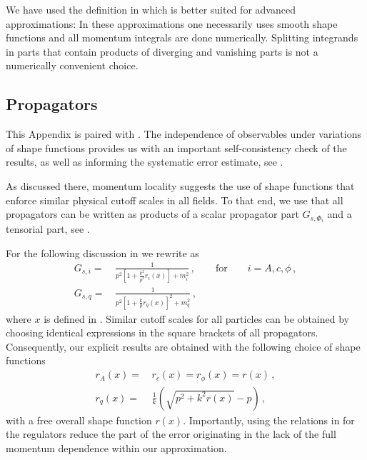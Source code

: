 \documentclass[aps,twocolumn,prd,superscriptaddress]{revtex4-2}
\begin{document}
We have used the definition in  which is better suited for advanced approximations: In these approximations one necessarily uses smooth shape functions and all momentum integrals are done numerically. Splitting integrands in parts that contain products of diverging and vanishing parts is not a numerically convenient choice. 


\subsection{Propagators} 
\label{app:Regs+Props}

This Appendix is paired with . The independence of observables under variations of shape functions provides us with an important self-consistency check of the results, as well as informing the systematic error estimate, see .  

As discussed there, momentum locality suggests the use of shape functions that enforce similar physical cutoff scales in all fields. To that end, we use that all propagators can be written as products of a scalar propagator part $G_{s,\Phi_i}$ and a tensorial part, see . 

For the following discussion in  we rewrite  
as 
%
\begin{align}\nonumber
	G_{s,i} =&\, \frac{1}{p^2\left[1 + \frac{k^2}{p^2} r_i(x)\right] + m^2_{i} }\,,\qquad \textrm{for}\qquad i= A,c,\phi\,,\\[1ex] 
	G_{s,q} = &\, \frac{1}{ p^2\left[1 + \frac{k}{p} r_q(x)\right]^2 + m^2_q }\,, 
\label{eq:ScalarProp}
\end{align}
%
where $x$ is defined in . Similar cutoff scales for all particles can be obtained by choosing identical expressions in the square brackets of all propagators. Consequently, our explicit results are obtained with the following choice of shape functions
%
\begin{align}\nonumber 
	r_A(x)=&\,r_c(x)=r_\phi(x)= r(x)\,,\\[1ex] 
	r_q(x) = &\,\frac{1}{k} \left( \sqrt{p^2 +k^2 r(x)} -p\right) \,,
\label{eq:rPhiEqual}
\end{align}
%
with a free overall shape function $r(x)$. Importantly, using the relations in  for the regulators reduce the part of the error originating in the lack of the full momentum dependence within our approximation.
\end{document}
